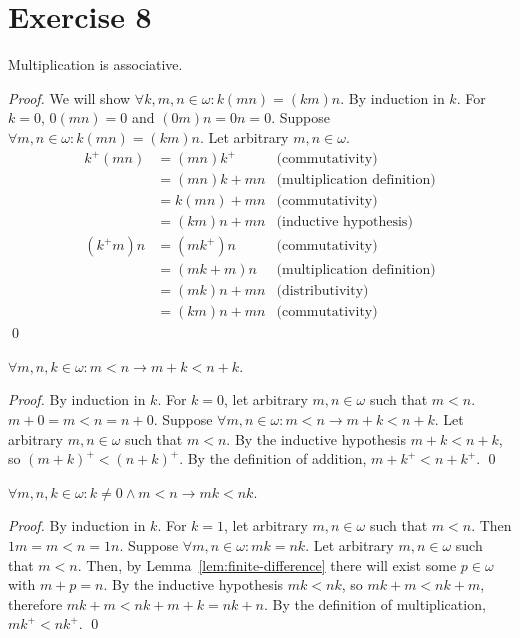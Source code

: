 \documentclass[11pt]{llncs}
\begin{document}
\section*{Exercise 8}
\begin{lemma}
  Multiplication is associative.
\end{lemma}
\begin{proof}
  We will show $\forall k, m, n \in \omega: k(mn) = (km)n$. By induction in $k$.
  For $k = 0$, $0(mn) = 0$ and $(0m)n = 0n = 0$.
  Suppose $\forall m, n \in \omega: k(mn) = (km)n$.
  Let arbitrary $m, n \in \omega$.
  \begin{align*}
  k^+(mn) &= (mn)k^+     &\text{(commutativity)}\\
          &= (mn)k + mn &\text{(multiplication definition)}\\
          &= k(mn) + mn &\text{(commutativity)}\\
          &= (km)n + mn &\text{(inductive hypothesis)}
  \end{align*}
  \begin{align*}
  (k^+m)n &= (mk^+)n     &\text{(commutativity)}\\
          &= (mk + m)n  &\text{(multiplication definition)}\\
          &= (mk)n + mn &\text{(distributivity)}\\
          &= (km)n + mn &\text{(commutativity)}
  \end{align*}
  \qed
\end{proof}

\begin{lemma}
  $\forall m, n, k \in \omega: m < n \rightarrow m + k < n + k$.
\end{lemma}
\begin{proof}
  By induction in $k$. For $k = 0$, let arbitrary $m, n \in \omega$ such that
  $m < n$. $m + 0 = m < n = n + 0$.
  Suppose $\forall m, n \in \omega: m < n \rightarrow m + k < n + k$.
  Let arbitrary $m, n \in \omega$ such that $m < n$.
  By the inductive hypothesis $m + k < n + k$, so $(m + k)^+ < (n + k)^+$.
  By the definition of addition, $m + k^+ < n + k^+$.
  \qed
\end{proof}

\begin{lemma}
  $\forall m, n, k \in \omega: k \neq 0 \land m < n \rightarrow mk < nk$.
\end{lemma}
\begin{proof}
  By induction in $k$. For $k = 1$, let arbitrary $m, n \in \omega$ such that
  $m < n$. Then $1m = m < n = 1n$.
  Suppose $\forall m, n \in \omega: mk = nk$.
  Let arbitrary $m, n \in \omega$ such that $m < n$.
  Then, by Lemma~\ref{lem:finite-difference} there will exist some
  $p \in \omega$ with $m + p = n$.
  By the inductive hypothesis $mk < nk$, so $mk + m < nk + m$, therefore
  $mk + m < nk + m + k = nk + n$.
  By the definition of multiplication, $mk^+ < nk^+$.
  \qed
\end{proof}
\end{document}
